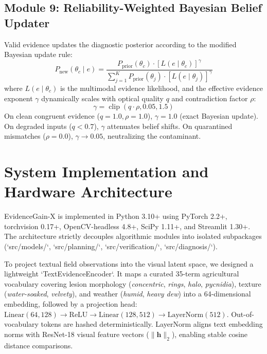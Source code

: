 \documentclass[conference]{IEEEtran}
\begin{document}
\subsection{Module 9: Reliability-Weighted Bayesian Belief Updater}
Valid evidence updates the diagnostic posterior according to the modified Bayesian update rule:
\begin{equation}
    P_{\text{new}}(\theta_c \mid e) = \frac{P_{\text{prior}}(\theta_c) \cdot \left[ L(e \mid \theta_c) \right]^\gamma}{\sum_{j=1}^K P_{\text{prior}}(\theta_j) \cdot \left[ L(e \mid \theta_j) \right]^\gamma}
\end{equation}
where $L(e \mid \theta_c)$ is the multimodal evidence likelihood, and the effective evidence exponent $\gamma$ dynamically scales with optical quality $q$ and contradiction factor $\rho$:
\begin{equation}
    \gamma = \operatorname{clip}(q \cdot \rho, 0.05, 1.5)
\end{equation}
On clean congruent evidence ($q=1.0, \rho=1.0$), $\gamma = 1.0$ (exact Bayesian update). On degraded inputs ($q < 0.7$), $\gamma$ attenuates belief shifts. On quarantined mismatches ($\rho = 0.0$), $\gamma \to 0.05$, neutralizing the contaminant.

\section{System Implementation and Hardware Architecture}

EvidenceGain-X is implemented in Python 3.10+ using PyTorch 2.2+, torchvision 0.17+, OpenCV-headless 4.8+, SciPy 1.11+, and Streamlit 1.30+. The architecture strictly decouples algorithmic modules into isolated subpackages (`src/models/`, `src/planning/`, `src/verification/`, `src/diagnosis/`).

To project textual field observations into the visual latent space, we designed a lightweight `TextEvidenceEncoder`. It maps a curated 35-term agricultural vocabulary covering lesion morphology (\textit{concentric}, \textit{rings}, \textit{halo}, \textit{pycnidia}), texture (\textit{water-soaked}, \textit{velvety}), and weather (\textit{humid}, \textit{heavy dew}) into a 64-dimensional embedding, followed by a projection head: $\text{Linear}(64, 128) \to \text{ReLU} \to \text{Linear}(128, 512) \to \text{LayerNorm}(512)$. Out-of-vocabulary tokens are hashed deterministically. LayerNorm aligns text embedding norms with ResNet-18 visual feature vectors ($\|\mathbf{h}\|_2$), enabling stable cosine distance comparisons.
\end{document}
